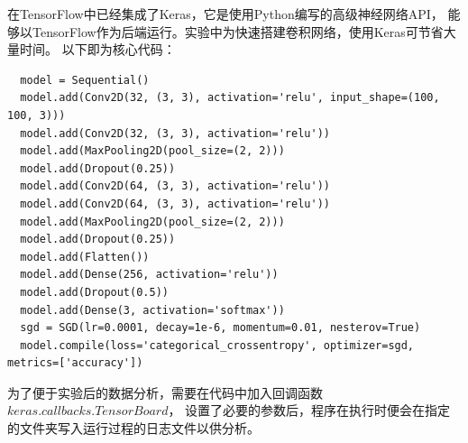     在TensorFlow中已经集成了Keras，它是使用Python编写的高级神经网络API，
    能够以TensorFlow作为后端运行。实验中为快速搭建卷积网络，使用Keras可节省大量时间。
    以下即为核心代码：

    \begin{lstlisting}
  model = Sequential()
  model.add(Conv2D(32, (3, 3), activation='relu', input_shape=(100, 100, 3)))
  model.add(Conv2D(32, (3, 3), activation='relu'))
  model.add(MaxPooling2D(pool_size=(2, 2)))
  model.add(Dropout(0.25))
  model.add(Conv2D(64, (3, 3), activation='relu'))
  model.add(Conv2D(64, (3, 3), activation='relu'))
  model.add(MaxPooling2D(pool_size=(2, 2)))
  model.add(Dropout(0.25))
  model.add(Flatten())
  model.add(Dense(256, activation='relu'))
  model.add(Dropout(0.5))
  model.add(Dense(3, activation='softmax'))
  sgd = SGD(lr=0.0001, decay=1e-6, momentum=0.01, nesterov=True)
  model.compile(loss='categorical_crossentropy', optimizer=sgd, metrics=['accuracy'])
    \end{lstlisting}

    为了便于实验后的数据分析，需要在代码中加入回调函数$keras.callbacks.TensorBoard$，
    设置了必要的参数后，程序在执行时便会在指定的文件夹写入运行过程的日志文件以供分析。
